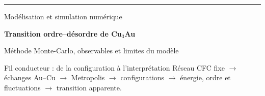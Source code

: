 \documentclass[aspectratio=169,10pt]{beamer}
\begin{document}
\begin{frame}[plain]
\vspace{4mm}
{\color{teal}\rule{\linewidth}{1.3pt}}
\vspace{5mm}
{\fontsize{12}{14}\selectfont Modélisation et simulation numérique\par}
\vspace{4mm}
{\fontsize{28}{32}\selectfont\bfseries Transition ordre--désordre de Cu$_3$Au\par}
\vspace{4mm}
{\fontsize{13}{16}\selectfont Méthode Monte-Carlo, observables et limites du modèle\par}
\vspace{6mm}
\begin{block}{Fil conducteur : de la configuration à l'interprétation}
Réseau CFC fixe $\to$ échanges Au--Cu $\to$ Metropolis $\to$ configurations
$\to$ énergie, ordre et fluctuations $\to$ transition apparente.
\end{block}
\vfill
\end{frame}
\end{document}

